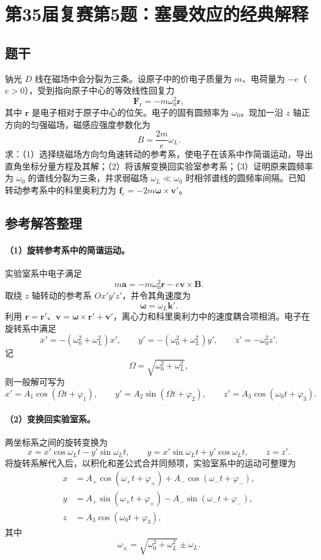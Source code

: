 \section{第35届复赛第5题：塞曼效应的经典解释}
\subsection{题干}
钠光 $D$ 线在磁场中会分裂为三条。设原子中的价电子质量为 $m$、电荷量为 $-e$（$e>0$），受到指向原子中心的等效线性回复力
\[
\boldsymbol F_{\mathrm r}=-m\omega_0^2\boldsymbol r,
\]
其中 $\boldsymbol r$ 是电子相对于原子中心的位矢。电子的固有圆频率为 $\omega_0$。现加一沿 $z$ 轴正方向的匀强磁场，磁感应强度参数化为
\[
B=\frac{2m}{e}\omega_L.
\]
求：（1）选择绕磁场方向匀角速转动的参考系，使电子在该系中作简谐运动，导出直角坐标分量方程及其解；（2）将该解变换回实验室参考系；（3）证明原来圆频率为 $\omega_0$ 的谱线分裂为三条，并求弱磁场 $\omega_L\ll\omega_0$ 时相邻谱线的圆频率间隔。已知转动参考系中的科里奥利力为 $\boldsymbol f_{\mathrm c}=-2m\boldsymbol\omega\times\boldsymbol v'$。

\subsection{参考解答整理}
\paragraph{（1）旋转参考系中的简谐运动。} 实验室系中电子满足
\[
m\boldsymbol a=-m\omega_0^2\boldsymbol r-e\boldsymbol v\times\boldsymbol B.
\]
取绕 $z$ 轴转动的参考系 $Ox'y'z'$，并令其角速度为
\[
\boldsymbol\omega=\omega_L\boldsymbol k'.
\]
利用 $\boldsymbol r=\boldsymbol r'$、$\boldsymbol v=\boldsymbol\omega\times\boldsymbol r'+\boldsymbol v'$，离心力和科里奥利力中的速度耦合项相消。电子在旋转系中满足
\[
\ddot x'=-(\omega_0^2+\omega_L^2)x',\qquad
\ddot y'=-(\omega_0^2+\omega_L^2)y',\qquad
\ddot z'=-\omega_0^2z'.
\]
记
\[
\Omega=\sqrt{\omega_0^2+\omega_L^2},
\]
则一般解可写为
\[
x'=A_1\cos(\Omega t+\varphi_1),\qquad
y'=A_2\sin(\Omega t+\varphi_2),\qquad
z'=A_3\cos(\omega_0t+\varphi_3).
\]

\paragraph{（2）变换回实验室系。} 两坐标系之间的旋转变换为
\[
x=x'\cos\omega_Lt-y'\sin\omega_Lt,\qquad
y=x'\sin\omega_Lt+y'\cos\omega_Lt,\qquad z=z'.
\]
将旋转系解代入后，以积化和差公式合并同频项，实验室系中的运动可整理为
\[
\begin{aligned}
x&=A_+\cos(\omega_+t+\varphi_+)+A_-\cos(\omega_-t+\varphi_-),\\
y&=A_+\sin(\omega_+t+\varphi_+)-A_-\sin(\omega_-t+\varphi_-),\\
z&=A_3\cos(\omega_0t+\varphi_3),
\end{aligned}
\]
其中
\[
\boxed{\omega_\pm=\sqrt{\omega_0^2+\omega_L^2}\pm\omega_L.}
\]

